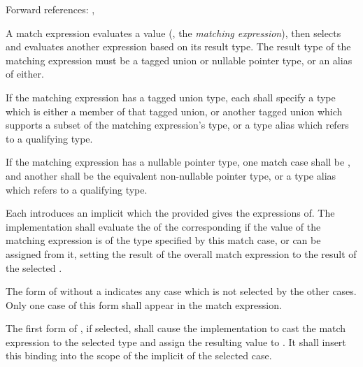 Forward references: , 

\specsubsubitem
A match expression evaluates a value (, the
\textit{matching expression}), then selects and evaluates another expression
based on its result type. The result type of the matching expression must be a
tagged union or nullable pointer type, or an alias of either.

\specsubsubitem
If the matching expression has a tagged union type, each
 shall specify a type which is either a member of that
tagged union, or another tagged union which supports a subset of the matching
expression's type, or a type alias which refers to a qualifying type.

\specsubsubitem
If the matching expression has a nullable pointer type, one match case shall be
, and another shall be the equivalent non-nullable pointer type,
or a type alias which refers to a qualifying type.

\specsubsubitem
Each  introduces an implicit
 which the provided
 gives the expressions of. The implementation
shall evaluate the  of the corresponding
 if the value of the matching expression is of the type
specified by this match case, or can be assigned from it, setting the result of
the overall match expression to the result of the selected
.



\specsubsubitem
The form of  without a  indicates any
case which is not selected by the other cases. Only one case of this form shall
appear in the match expression.

\specsubsubitem
The first form of , if selected, shall cause the
implementation to cast the match expression to the selected type and assign the
resulting value to . It shall insert this binding into the
scope of the implicit  of the selected case.

